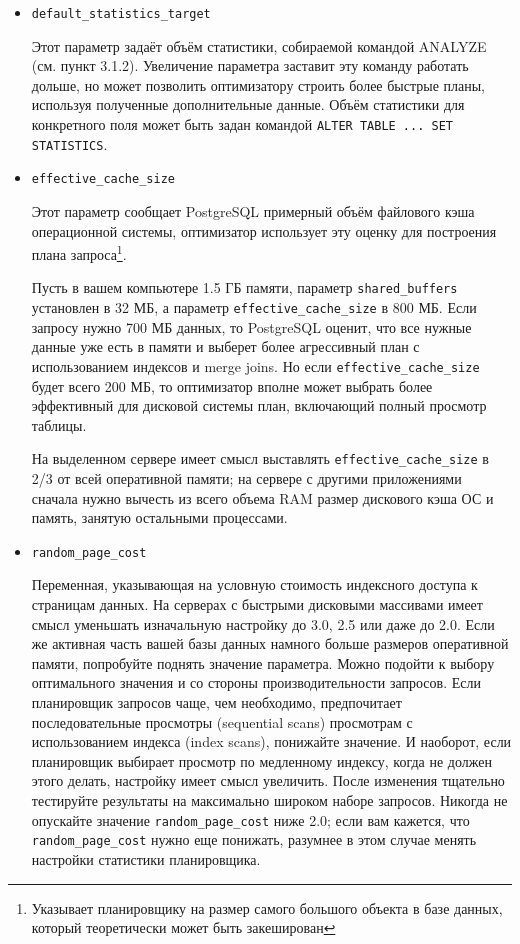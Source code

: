 \begin{itemize}
  \item \lstinline!default_statistics_target!

  Этот параметр задаёт объём статистики, собираемой командой ANALYZE (см. пункт 3.1.2). Увеличение параметра заставит эту команду работать дольше, но может позволить оптимизатору строить более быстрые планы, используя полученные дополнительные данные. Объём статистики для конкретного поля может быть задан командой \lstinline!ALTER TABLE ... SET STATISTICS!.

  \item \lstinline!effective_cache_size!

  Этот параметр сообщает PostgreSQL примерный объём файлового кэша операционной системы, оптимизатор использует эту оценку для построения плана запроса\footnote{Указывает планировщику на размер самого большого объекта в базе данных, который теоретически может быть закеширован}.

Пусть в вашем компьютере 1.5 ГБ памяти, параметр \lstinline!shared_buffers! установлен в 32 МБ, а параметр \lstinline!effective_cache_size! в 800 МБ. Если запросу нужно 700 МБ данных, то PostgreSQL оценит, что все нужные данные уже есть в памяти и выберет более агрессивный план с использованием индексов и merge joins. Но если \lstinline!effective_cache_size! будет всего 200 МБ, то оптимизатор вполне может выбрать более эффективный для дисковой системы план, включающий полный просмотр таблицы.

На выделенном сервере имеет смысл выставлять \lstinline!effective_cache_size! в 2/3 от всей оперативной памяти; на сервере с другими приложениями сначала нужно вычесть из всего объема RAM размер дискового кэша ОС и память, занятую остальными процессами.

  \item \lstinline!random_page_cost!

  Переменная, указывающая на условную стоимость индексного доступа к страницам данных. На серверах с быстрыми дисковыми массивами имеет смысл уменьшать изначальную настройку до 3.0, 2.5 или даже до 2.0. Если же активная часть вашей базы данных намного больше размеров оперативной памяти, попробуйте поднять значение параметра. Можно подойти к выбору оптимального значения и со стороны производительности запросов. Если планировщик запросов чаще, чем необходимо, предпочитает последовательные просмотры (sequential scans) просмотрам с использованием индекса (index scans), понижайте значение. И наоборот, если планировщик выбирает просмотр по медленному индексу, когда не должен этого делать, настройку имеет смысл увеличить. После изменения тщательно тестируйте результаты на максимально широком наборе запросов. Никогда не опускайте значение \lstinline!random_page_cost! ниже 2.0; если вам кажется, что \lstinline!random_page_cost! нужно еще понижать, разумнее в этом случае менять настройки статистики планировщика.
\end{itemize}


